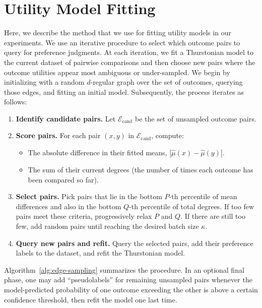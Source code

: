 \section{Utility Model Fitting}
\label{sec:active-learning}

Here, we describe the method that we use for fitting utility models in our experiments. We use an iterative procedure to select which outcome pairs to query for preference judgments. At each iteration, we fit a Thurstonian model to the current dataset of pairwise comparisons and then choose new pairs where the outcome utilities appear most ambiguous or under-sampled. We begin by initializing with a random $d$-regular graph over the set of outcomes, querying those edges, and fitting an initial model. Subsequently, the process iterates as follows:

\begin{enumerate}
    \item \textbf{Identify candidate pairs.} Let $\mathcal{E}_{\text{cand}}$ be the set of unsampled outcome pairs.
    \item \textbf{Score pairs.} For each pair $(x,y)$ in $\mathcal{E}_{\text{cand}}$, compute:
    \begin{itemize}
        \item The absolute difference in their fitted means, $|\hat{\mu}(x) - \hat{\mu}(y)|$.
        \item The sum of their current degrees (the number of times each outcome has been compared so far).
    \end{itemize}
    \item \textbf{Select pairs.} Pick pairs that lie in the bottom $P$-th percentile of mean differences and also in the bottom $Q$-th percentile of total degrees. If too few pairs meet these criteria, progressively relax $P$ and $Q$. If there are still too few, add random pairs until reaching the desired batch size $\kappa$.
    \item \textbf{Query new pairs and refit.} Query the selected pairs, add their preference labels to the dataset, and refit the Thurstonian model.
\end{enumerate}

Algorithm~\ref{alg:edge-sampling} summarizes the procedure. In an optional final phase, one may add ``pseudolabels'' for remaining unsampled pairs whenever the model-predicted probability of one outcome exceeding the other is above a certain confidence threshold, then refit the model one last time.

